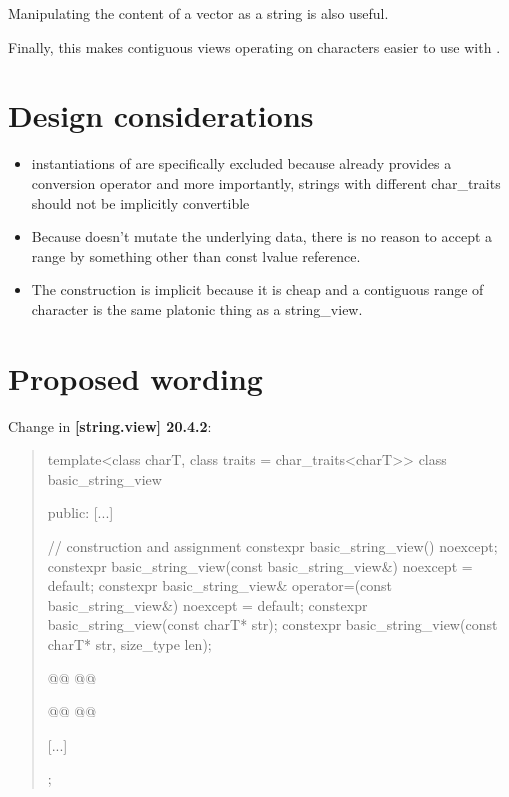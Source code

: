 \documentclass{wg21}
\begin{document}
Manipulating the content of a vector as a string is also useful.

Finally, this makes contiguous views operating on characters easier to use with .


\section{Design considerations}

\begin{itemize}
    \item instantiations of  are specifically excluded because  already provides a conversion operator and more importantly,
    strings with different char_traits should not be implicitly convertible
    \item Because  doesn't mutate the underlying data, there is no reason to accept a range by something other than const lvalue reference.
    \item The construction is implicit because it is cheap and a contiguous range of character is the same platonic thing as a string_view.

\end{itemize}

\section{Proposed wording}

Change in \textbf{[string.view] 20.4.2}:
\begin{quote}
\begin{codeblock}

template<class charT, class traits = char_traits<charT>>
class basic_string_view {
public:
    [...]

    // construction and assignment
    constexpr basic_string_view() noexcept;
    constexpr basic_string_view(const basic_string_view&) noexcept = default;
    constexpr basic_string_view& operator=(const basic_string_view&) noexcept = default;
    constexpr basic_string_view(const charT* str);
    constexpr basic_string_view(const charT* str, size_type len);

    @@
    @@

    @@
    @@

    [...]
};

\end{codeblock}
\end{quote}
\end{document}
